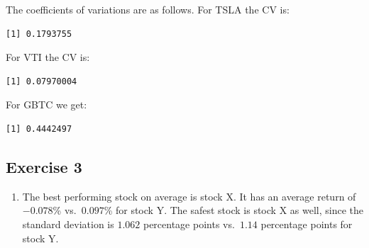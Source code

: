 \documentclass[
  letterpaper,
  DIV=11,
  numbers=noendperiod]{scrreprt}
\newenvironment{Shaded}{\begin{snugshade}}{\end{snugshade}}
\newcommand{\FunctionTok}[1]{\textcolor[rgb]{0.28,0.35,0.67}{#1}}
\newcommand{\NormalTok}[1]{\textcolor[rgb]{0.00,0.23,0.31}{#1}}
\newcommand{\OtherTok}[1]{\textcolor[rgb]{0.00,0.23,0.31}{#1}}
\newcommand{\SpecialCharTok}[1]{\textcolor[rgb]{0.37,0.37,0.37}{#1}}
\providecommand{\tightlist}{%
  \setlength{\itemsep}{0pt}\setlength{\parskip}{0pt}}\usepackage{longtable,booktabs,array}
\begin{document}
The coefficients of variations are as follows. For TSLA the CV is:

\begin{Shaded}
\end{Shaded}

\begin{verbatim}
[1] 0.1793755
\end{verbatim}

For VTI the CV is:

\begin{Shaded}
\end{Shaded}

\begin{verbatim}
[1] 0.07970004
\end{verbatim}

For GBTC we get:

\begin{Shaded}
\end{Shaded}

\begin{verbatim}
[1] 0.4442497
\end{verbatim}

\hypertarget{exercise-3-7}{%
\subsection*{Exercise 3}\label{exercise-3-7}}

\begin{enumerate}
\def\labelenumi{\arabic{enumi}.}
\tightlist
\item
  The best performing stock on average is stock X. It has an average
  return of \(-0.078\)\% vs.~\(0.097\)\% for stock Y. The safest stock
  is stock X as well, since the standard deviation is \(1.062\)
  percentage points vs.~\(1.14\) percentage points for stock Y.
\end{enumerate}
\end{document}
